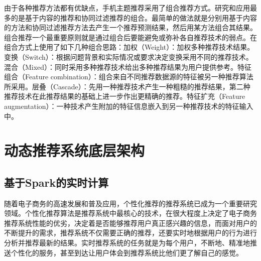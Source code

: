 \begin{enumerate}[(1)]
    由于各种推荐方法都有优缺点，手机主题推荐采用了组合推荐方式。研究和应用最多的是基于内容的推荐和协同过滤推荐的组合。最简单的做法就是分别用基于内容的方法和协同过滤推荐方法去产生一个推荐预测结果，然后用某方法组合其结果。组合推荐一个最重要原则就是通过组合后要能避免或弥补各自推荐技术的弱点。在组合方式上使用了如下几种组合思路：加权（Weight）：加权多种推荐技术结果。变换（Switch）：根据问题背景和实际情况或要求决定变换采用不同的推荐技术。混合（Mixed）：同时采用多种推荐技术给出多种推荐结果为用户提供参考。特征组合（Feature combination）：组合来自不同推荐数据源的特征被另一种推荐算法所采用。层叠（Cascade）：先用一种推荐技术产生一种粗糙的推荐结果，第二种推荐技术在此推荐结果的基础上进一步作出更精确的推荐。特征扩充（Feature augmentation）：一种技术产生附加的特征信息嵌入到另一种推荐技术的特征输入中。
    \end{enumerate}

  \section{动态推荐系统底层架构}
    \subsection{基于Spark的实时计算}
    随着电子商务的高速发展和普及应用，个性化推荐的推荐系统已成为一个重要研究领域。个性化推荐算法是推荐系统中最核心的技术，在很大程度上决定了电子商务推荐系统性能的优劣，决定着是否能够推荐用户真正感兴趣的信息，而面对用户的不断提升的需求，推荐系统不仅需要正确的推荐，还要实时地根据用户的行为进行分析并推荐最新的结果。实时推荐系统的任务就是为每个用户，不断地、精准地推送个性化的服务，甚至到达让用户体会到推荐系统比他们更了解自己的感觉。

